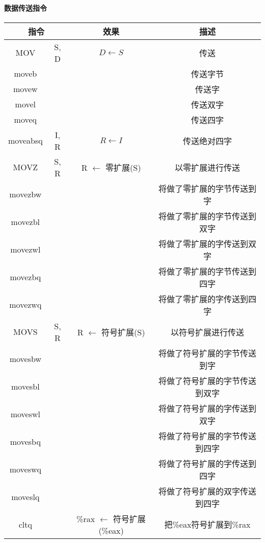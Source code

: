 \paragraph{数据传送指令}
\begin{table}[H]
    \centering
    \begin{tabular}{|c c|c|c|}
        \hline
        \multicolumn{2}{|c|}{\textbf{指令}} & \textbf{效果} & \textbf{描述} \\
        \hline
        MOV & S, D & $D \leftarrow S$ & 传送 \\
        \hline
        moveb &&& 传送字节 \\
        movew &&& 传送字 \\
        movel &&& 传送双字 \\
        moveq &&& 传送四字 \\
        moveabsq & I, R & $R \leftarrow I$ & 传送绝对四字 \\
        \hline
        MOVZ & S, R & R $\leftarrow$ 零扩展(S) & 以零扩展进行传送 \\
        \hline
        movezbw &&& 将做了零扩展的字节传送到字 \\
        movezbl &&& 将做了零扩展的字节传送到双字 \\
        movezwl &&& 将做了零扩展的字传送到双字 \\
        movezbq &&& 将做了零扩展的字节传送到四字 \\
        movezwq &&& 将做了零扩展的字传送到四字 \\
        \hline
        MOVS & S, R & R $\leftarrow$ 符号扩展(S) & 以符号扩展进行传送 \\
        \hline
        movesbw &&& 将做了符号扩展的字节传送到字 \\
        movesbl &&& 将做了符号扩展的字节传送到双字 \\
        moveswl &&& 将做了符号扩展的字传送到双字 \\
        movesbq &&& 将做了符号扩展的字节传送到四字 \\
        moveswq &&& 将做了符号扩展的字传送到四字 \\
        moveslq &&& 将做了符号扩展的双字传送到四字 \\
        cltq && \%rax $\leftarrow$ 符号扩展(\%eax) & 把\%eax符号扩展到\%rax \\
        \hline
    \end{tabular}
\end{table}
